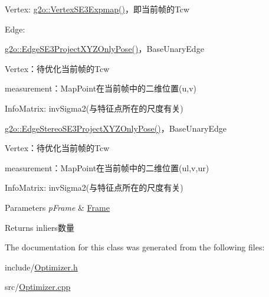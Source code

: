 \begin{DoxyEnumerate}
\item Vertex\+: \mbox{\hyperlink{classg2o_1_1_vertex_s_e3_expmap}{g2o\+::\+Vertex\+S\+E3\+Expmap()}}，即当前帧的\+Tcw
\item Edge\+:
\begin{DoxyItemize}
\item \mbox{\hyperlink{classg2o_1_1_edge_s_e3_project_x_y_z_only_pose}{g2o\+::\+Edge\+S\+E3\+Project\+X\+Y\+Z\+Only\+Pose()}}，\+Base\+Unary\+Edge
\begin{DoxyItemize}
\item Vertex：待优化当前帧的\+Tcw
\item measurement：\+Map\+Point在当前帧中的二维位置(u,v)
\item Info\+Matrix\+: inv\+Sigma2(与特征点所在的尺度有关)
\end{DoxyItemize}
\item \mbox{\hyperlink{classg2o_1_1_edge_stereo_s_e3_project_x_y_z_only_pose}{g2o\+::\+Edge\+Stereo\+S\+E3\+Project\+X\+Y\+Z\+Only\+Pose()}}，\+Base\+Unary\+Edge
\begin{DoxyItemize}
\item Vertex：待优化当前帧的\+Tcw
\item measurement：\+Map\+Point在当前帧中的二维位置(ul,v,ur)
\item Info\+Matrix\+: inv\+Sigma2(与特征点所在的尺度有关)
\end{DoxyItemize}
\end{DoxyItemize}
\end{DoxyEnumerate}


\begin{DoxyParams}{Parameters}
{\em p\+Frame} & \mbox{\hyperlink{class_o_r_b___s_l_a_m2_1_1_frame}{Frame}} \\
\hline
\end{DoxyParams}
\begin{DoxyReturn}{Returns}
inliers数量 
\end{DoxyReturn}


The documentation for this class was generated from the following files\+:\begin{DoxyCompactItemize}
\item 
include/\mbox{\hyperlink{_optimizer_8h}{Optimizer.\+h}}\item 
src/\mbox{\hyperlink{_optimizer_8cpp}{Optimizer.\+cpp}}\end{DoxyCompactItemize}
